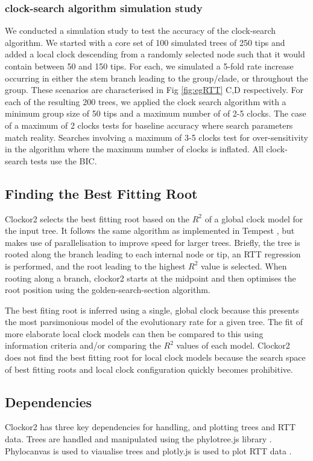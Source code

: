 \documentclass{article}
\begin{document}
\subsubsection*{clock-search algorithm simulation study}
We conducted a simulation study to test the accuracy of the clock-search algorithm. We started with a core set of 100 simulated trees of 250 tips and added a local clock descending from a randomly selected node such that it would contain between 50 and 150 tips. For each, we simulated a 5-fold rate increase occurring in either the stem branch leading to the group/clade, or throughout the group. These scenarios are characterised in  Fig \ref{fig:egRTT} C,D respectively. For each of the resulting 200 trees, we applied the clock search algorithm with a minimum group size of 50 tips and a maximum number of of 2-5 clocks. The case of a maximum of 2 clocks tests for baseline accuracy where search parameters match reality. Searches involving a maximum of 3-5 clocks test for over-sensitivity in the algorithm where the maximum number of clocks is inflated. All clock-search tests use the BIC.


\subsection*{Finding the Best Fitting Root}
Clockor2 selects the best fitting root based on the $R^2$ of a global clock model for the input tree. It follows the same algorithm as implemented in Tempest \citet{rambaut_exploring_2016}, but makes use of parallelisation to improve speed for larger trees. Briefly, the tree is rooted along the branch leading to each internal node or tip, an RTT regression is performed, and the root leading to the highest $R^2$ value is selected. When rooting along a branch, clockor2 starts at the midpoint and then optimises the root position using the golden-search-section algorithm.

The best fiting root is inferred using a single, global clock because this presents the most parsimonious model of the evolutionary rate for a given tree. The fit of more elaborate local clock models can then be compared to this using information criteria and/or comparing the $R^2$ values of each model. Clockor2 does not find the best fitting root for local clock models because the search space of best fitting roots and local clock configuration quickly becomes prohibitive.

\subsection*{Dependencies}
Clockor2 has three key dependencies for handling, and plotting trees and RTT data. Trees are handled and manipulated using the phylotree.js library \citep{shank_phylotreejs_2018}. Phylocanvas is used to viaualise trees and plotly.js is used to plot RTT data \citep{abudahab_phylocanvasgl_2021}.
\end{document}
